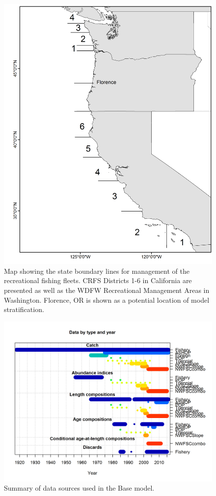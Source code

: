 \documentclass[12pt,]{article}
\begin{document}
\begin{figure}
\centering
\includegraphics{Figures/boundary_map.png}
\caption{Map showing the state boundary lines for management of the
recreational fishing fleets. CRFS Districts 1-6 in California are
presented as well as the WDFW Recreational Management Areas in
Washington. Florence, OR is shown as a potential location of model
stratification. \label{fig:boundary_map}}
\end{figure}

\begin{figure}
\centering
\includegraphics{r4ss/plots_mod1/data_plot.png}
\caption{Summary of data sources used in the Base model.
\label{fig:data_plot}}
\end{figure}
\end{document}
